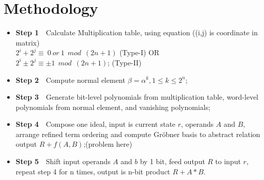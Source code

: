 \documentclass[conference]{IEEEtran}
\begin{document}
\section{Methodology}
\begin{itemize}
\item \textbf{Step 1}\ \ Calculate Multiplication table, using equation ((i,j) is coordinate in matrix)\\
		$2^i + 2^j \equiv \ 0\  or\  1 \ \ mod\ \  (2n + 1)$ (Type-I) OR\\
		$2^i\pm 2^j \equiv \pm1 \ \ mod\ \  (2n + 1)$; (Type-II)\cite{KAUST}
\item \textbf{Step 2}\ \ Compute normal element $\beta = \alpha^k, 1\leq k\leq 2^n$;
\item \textbf{Step 3}\ \ Generate bit-level polynomials from multiplication table, word-level polynomials
		from normal element, and vanishing polynomials;
\item \textbf{Step 4}\ \ Compose one ideal, input is current state $r$, operands $A$ and $B$, arrange refined
		term ordering and compute Gr\"obner basis to abstract relation output $R + f(A, B)$;(problem here)
\item \textbf{Step 5}\ \ Shift input operands $A$ and $b$ by 1 bit, feed output $R$ to input $r$, repeat step 4
		for n times, output is n-bit product $R + A * B$.
\end{itemize}
















\end{document}
